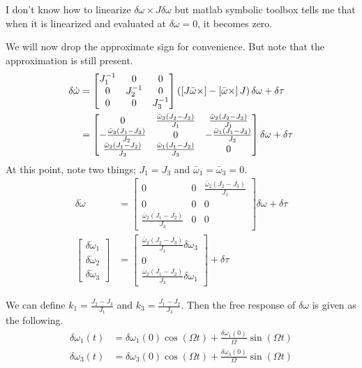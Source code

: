 \documentclass[]{article}
\begin{document}
I don't know how to linearize $\delta \omega \times J \delta \omega$ but matlab symbolic toolbox tells me that when it is linearized and evaluated at $\delta \omega = 0$, it becomes zero.

We will now drop the approximate sign for convenience. But note that the approximation is still present.
\begin{align}
	\delta \dot{\omega} & = \begin{bmatrix}
	J_1^{-1} & 0 & 0 \\
	0 & J_2^{-1} & 0 \\
	0 & 0 & J_3^{-1}
	\end{bmatrix} \left( \left[ J \bar{\omega} \times \right] - \left[ \bar{\omega} \times \right] J \right) \delta \omega + \delta \tau \\
	& = \begin{bmatrix}
	0 & \frac{\bar{\omega}_3(J_2 - J_3)}{J_1} & \frac{\bar{\omega}_2(J_2 - J_3)}{J_1} \\
	-\frac{\bar{\omega}_3(J_1 - J_3)}{J_2} & 0 & -\frac{\bar{\omega}_1(J_1 - J_3)}{J_2} \\
	\frac{\bar{\omega}_2(J_1 - J_2)}{J_3} & \frac{\bar{\omega}_1(J_1 - J_2)}{J_3} & 0
	\end{bmatrix} \delta \omega + \delta \tau
\end{align}
At this point, note two things; $J_1 = J_3$ and $\bar{\omega}_1 = \bar{\omega}_3 = 0$.
\begin{align}
\delta \dot{\omega} & = \begin{bmatrix}
0 & 0 & \frac{\bar{\omega}_2(J_2 - J_3)}{J_1} \\
0 & 0 & 0 \\
\frac{\bar{\omega}_2(J_1 - J_2)}{J_3} & 0 & 0
\end{bmatrix} \delta \omega + \delta \tau \\
\begin{bmatrix}
\delta \dot{\omega}_1 \\
\delta \dot{\omega}_2 \\
\delta \dot{\omega}_3
\end{bmatrix} & = \begin{bmatrix}
\frac{\bar{\omega}_2(J_2 - J_3)}{J_1} \delta \omega_3 \\
0 \\
\frac{\bar{\omega}_2(J_1 - J_2)}{J_3} \delta \omega_1
\end{bmatrix} + \delta \tau
\end{align}

We can define $k_1 = \frac{J_2 - J_3}{J_1}$ and $k_3 = \frac{J_1 - J_2}{J_3}$. Then the free response of $\delta \omega$ is given as the following.
\begin{align}
	\delta \omega_1 (t) & = \delta \omega_1(0) \cos(\Omega t) + \frac{\delta \dot{\omega}_1 (0)}{\Omega} \sin(\Omega t) \\
	\delta \omega_3 (t) & = \delta \omega_3(0) \cos(\Omega t) + \frac{\delta \dot{\omega}_3 (0)}{\Omega} \sin(\Omega t) 
\end{align}
\end{document}
